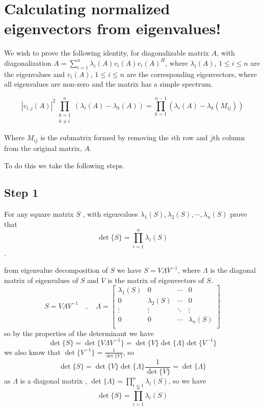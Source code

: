 \section{Calculating normalized eigenvectors from eigenvalues!
}
We wish to prove the following identity, for diagonalizable matrix \( A \), with diagonalization 
$ A = \sum_{i=1}^{n} \lambda_i(A)v_i(A)v_i(A)^H $,
where \( \lambda_i(A) \), \( 1 \leq i \leq n \) are the eigenvalues and \( v_i(A) \), \( 1 \leq i \leq n \) are the corresponding eigenvectors, where all eigenvalues are non-zero and the matrix has a simple spectrum.

$$ \left| v_{i,j}(A) \right|^2 \prod_{\substack{k=1 \\ k \neq i}}^{n} \left( \lambda_i(A) - \lambda_k(A) \right) = \prod_{k=1}^{n-1} \left( \lambda_i(A) - \lambda_k(M_{ij}) \right) $$

Where \( M_{ij} \) is the submatrix formed by removing the \( i \)th row and \( j \)th column from the original matrix, \( A \).

To do this we take the following steps.
\subsection{Step 1}
For any square matrix $S$ , with eigenvalues $\lambda_1(S),\lambda_2(S),\cdots,\lambda_n(S)$ prove that
 $$\det\{S\} = \prod_{i=1}^{n} \lambda_i(S)$$.
\begin{qsolve}
	\begin{qsolve}[]
		from eigenvalue decomposition of $S$ we have $S = V \Lambda V^{-1}$, where $\Lambda$ is the diagonal matrix of eigenvalues of $S$ and $V$ is the matrix of eigenvectors of $S$.
		$$S = V \Lambda V^{-1} \quad , \quad \Lambda = \begin{bmatrix}
			\lambda_1(S) & 0 & \cdots & 0 \\
			0 & \lambda_2(S) & \cdots & 0 \\
			\vdots & \vdots & \ddots & \vdots \\
			0 & 0 & \cdots & \lambda_n(S) \\
		\end{bmatrix}$$
		so by the properties of the determinant we have
		$$\det\{S\} = \det\{V\Lambda V^{-1}\} = \det\{V\}\det\{\Lambda\}\det\{V^{-1}\}$$
		we also know that $\det\{V^{-1}\} = \frac{1}{\det\{V\}}$, so
		$$\det\{S\} = \det\{V\}\det\{\Lambda\}\frac{1}{\det\{V\}} = \det\{\Lambda\}$$
		as $\Lambda$ is a diagonal matrix ,  $\det\{\Lambda\} = \prod_{i=1}^{n} \lambda_i(S)$, so we have
		$$\det\{S\} = \prod_{i=1}^{n} \lambda_i(S)$$
	\end{qsolve}
\end{qsolve}

